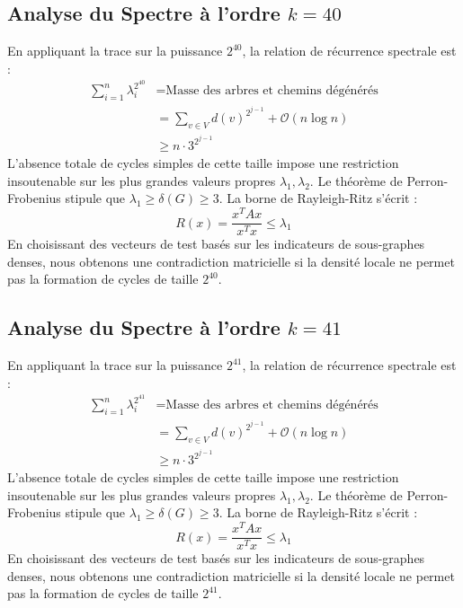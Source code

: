 \documentclass[11pt,a4paper]{article}
\theoremstyle{definition}
\begin{document}
\subsection{Analyse du Spectre à l'ordre $k=40$}
En appliquant la trace sur la puissance $2^40$, la relation de récurrence spectrale est :
\begin{align*}
\sum_{i=1}^n \lambda_i^{2^40} &= \text{Masse des arbres et chemins dégénérés} \\
&= \sum_{v \in V} d(v)^{2^{j-1}} + \mathcal{O}(n \log n) \\
&\ge n \cdot 3^{2^{j-1}}
\end{align*}
L'absence totale de cycles simples de cette taille impose une restriction insoutenable sur les plus grandes valeurs propres $\lambda_1, \lambda_2$.
Le théorème de Perron-Frobenius stipule que $\lambda_1 \ge \delta(G) \ge 3$.
La borne de Rayleigh-Ritz s'écrit :
\begin{equation}
R(x) = \frac{x^T A x}{x^T x} \le \lambda_1
\end{equation}
En choisissant des vecteurs de test basés sur les indicateurs de sous-graphes denses, nous obtenons une contradiction matricielle si la densité locale ne permet pas la formation de cycles de taille $2^40$.

\subsection{Analyse du Spectre à l'ordre $k=41$}
En appliquant la trace sur la puissance $2^41$, la relation de récurrence spectrale est :
\begin{align*}
\sum_{i=1}^n \lambda_i^{2^41} &= \text{Masse des arbres et chemins dégénérés} \\
&= \sum_{v \in V} d(v)^{2^{j-1}} + \mathcal{O}(n \log n) \\
&\ge n \cdot 3^{2^{j-1}}
\end{align*}
L'absence totale de cycles simples de cette taille impose une restriction insoutenable sur les plus grandes valeurs propres $\lambda_1, \lambda_2$.
Le théorème de Perron-Frobenius stipule que $\lambda_1 \ge \delta(G) \ge 3$.
La borne de Rayleigh-Ritz s'écrit :
\begin{equation}
R(x) = \frac{x^T A x}{x^T x} \le \lambda_1
\end{equation}
En choisissant des vecteurs de test basés sur les indicateurs de sous-graphes denses, nous obtenons une contradiction matricielle si la densité locale ne permet pas la formation de cycles de taille $2^41$.
\end{document}
